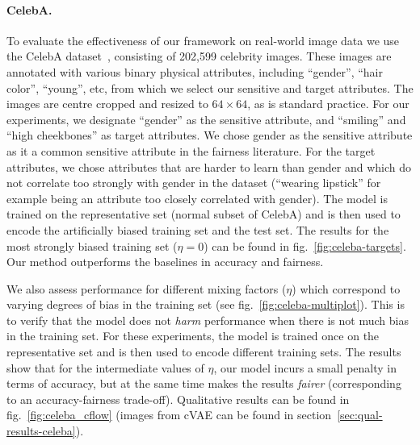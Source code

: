 \paragraph{CelebA.}
To evaluate the effectiveness of our framework on real-world image data we use the CelebA dataset~\citep{liu2015faceattributes}, consisting of 202,599 celebrity images.
These images are annotated with various binary physical  attributes, including ``gender'', ``hair color'', ``young'', etc, from which we  select our sensitive and target attributes.
The images are centre cropped and resized to $64\times64$, as is standard practice.
For our experiments, we designate ``gender'' as the sensitive attribute,
and ``smiling'' and ``high cheekbones'' as target attributes.
We chose gender as the sensitive attribute as it a common sensitive attribute in the fairness literature.
For the target attributes, we chose attributes that are harder to learn than gender and which do not correlate too strongly with gender in the dataset
(``wearing lipstick'' for example being an attribute too closely correlated with gender).
The model is trained on the representative set (normal subset of CelebA)
and is then used to encode the artificially biased training set and the test set.
The results for the most strongly biased training set ($\eta=0$) can be found in fig.~\ref{fig:celeba-targets}.
Our method outperforms the baselines in accuracy and fairness.

We also assess performance for different mixing factors ($\eta$) which correspond to varying degrees of bias in the training set
(see fig.~\ref{fig:celeba-multiplot}).
This is to verify that the model does not \emph{harm} performance when there is not much bias in the training set.
For these experiments, the model is trained once on the representative set and is then used to encode different training sets.
The results show that for the intermediate values of $\eta$, our model incurs a small penalty in terms of accuracy,
but at the same time makes the results \emph{fairer} (corresponding to an accuracy-fairness trade-off). Qualitative results can be found in fig.~\ref{fig:celeba_cflow} (images from cVAE can be found in section~\ref{sec:qual-results-celeba}).

